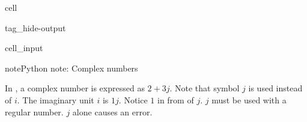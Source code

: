 \documentclass[letterpaper,10pt,english]{jupyterBook}
\begin{document}
\begin{sphinxuseclass}{cell}
\begin{sphinxuseclass}{tag_hide-output}\begin{sphinxVerbatimInput}

\begin{sphinxuseclass}{cell_input}
\begin{sphinxVerbatim}[commandchars=\\\{\}]

   

     
     

  
  
    

\end{sphinxVerbatim}

\end{sphinxuseclass}\end{sphinxVerbatimInput}

\end{sphinxuseclass}
\end{sphinxuseclass}
\begin{sphinxadmonition}{note}{Python note: Complex numbers}

\sphinxAtStartPar
In , a complex number is expressed as \(2 + 3j\).  Note that symbol \(j\) is used instead of \(i\).  The imaginary unit \(i\) is \(1j\).  Notice \(1\) in from of \(j\).  \(j\) must be used with a regular number.  \(j\) alone causes an error.
\end{sphinxadmonition}
\end{document}
